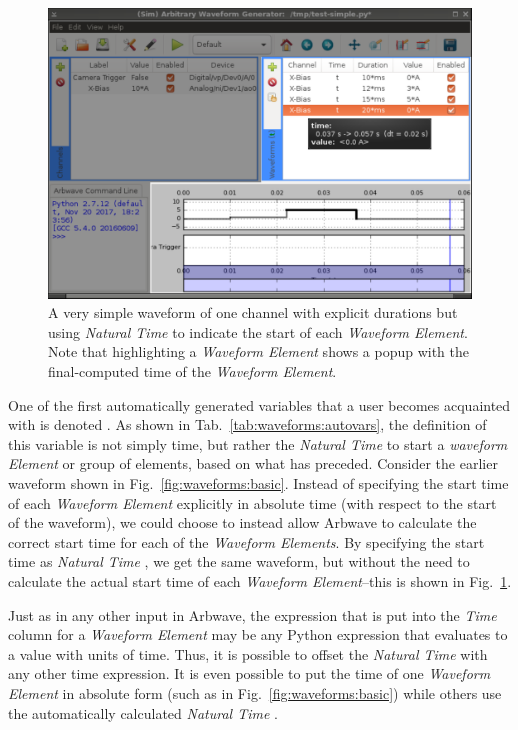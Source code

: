 \begin{figure}[ht!]
  \centerline{\includegraphics[width=.8\textwidth]{figures/basic-waveform_t}}
  \caption[Very simple waveform using \textit{Natural Time} ]{
    A very simple waveform of one channel with explicit durations but using
    \textit{Natural Time} to indicate the start of each \textit{Waveform
    Element}.  Note that highlighting a \textit{Waveform Element} shows a popup
    with the final-computed time of the \textit{Waveform Element}.
  }
  \label{fig:waveforms:basic_t}
\end{figure}

One of the first automatically generated variables that a user becomes
acquainted with is denoted .  As shown in
Tab.~\ref{tab:waveforms:autovars}, the definition of this variable is not simply
time, but rather the \textit{Natural Time} to start a \textit{waveform Element}
or group of elements, based on what has preceded.  Consider the earlier waveform
shown in Fig.~\ref{fig:waveforms:basic}.  Instead of specifying the start time
of each \textit{Waveform Element} explicitly in absolute time (with respect to
the start of the waveform), we could choose to instead allow Arbwave to
calculate the correct start time for each of the \textit{Waveform Elements}.  By
specifying the start time as \textit{Natural Time} , we get
the same waveform, but without the need to calculate the actual start time of
each \textit{Waveform Element}--this is shown in
Fig.~\ref{fig:waveforms:basic_t}.

Just as in any other input in Arbwave, the expression that is put into
the \textit{Time} column for a \textit{Waveform Element} may be any Python
expression that evaluates to a value with units of time.  Thus, it is possible
to offset the \textit{Natural Time}  with any other time
expression.  It is even possible to put the time of one \textit{Waveform Element} in absolute
form (such as in Fig.~\ref{fig:waveforms:basic}) while others use the
automatically calculated \textit{Natural Time} .


